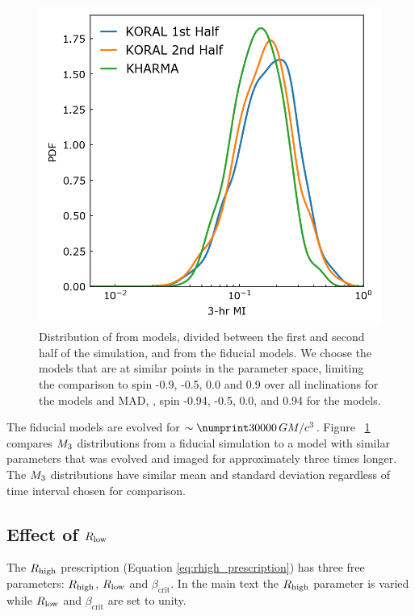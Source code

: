 \begin{figure}
  \centering
  \includegraphics[width=\columnwidth]{./figures/Koral_vs_IL_MI.png}
  \caption{Distribution of  from \koral models, divided between the first and second half of the simulation, and from the fiducial \kharma models. We choose the models that are at similar points in the parameter space, limiting the comparison to spin -0.9, -0.5, 0.0 and 0.9 over all inclinations for the \koral models and MAD, , spin -0.94, -0.5, 0.0, and 0.94 for the \kharma models.}
  \label{fig:koral_MI}
\end{figure}

The fiducial models are evolved for $\sim \no{30000}\,\tg$.
Figure ~\ref{fig:koral_MI} compares $M_{3}$ distributions from a fiducial \kharma simulation to a \koral model with similar parameters that was evolved and imaged for approximately three times longer.
The $M_{3}$ distributions have similar mean and standard deviation regardless of time interval chosen for comparison.

\subsection{Effect of \texorpdfstring{$R_\mathrm{low}$}{Rlow}}

The $R_\mathrm{high}$ prescription (Equation \ref{eq:rhigh_prescription}) has three free parameters: $R_\mathrm{high}$, $R_\mathrm{low}$ and $\beta_\mathrm{crit}$.
In the main text the $R_\mathrm{high}$ parameter is varied while $R_\mathrm{low}$ and $\beta_\mathrm{crit}$ are set to unity.

